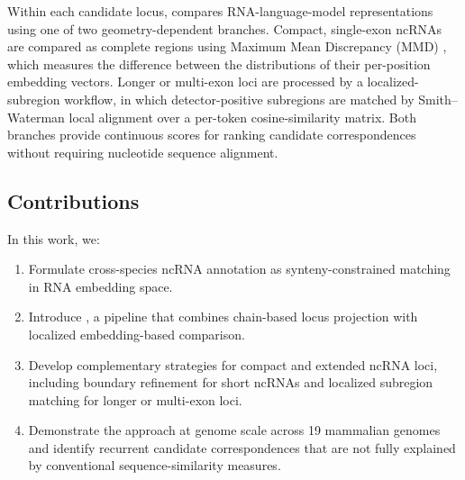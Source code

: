 Within each candidate locus, \curia{} compares RNA-language-model
representations using one of two geometry-dependent branches. Compact,
single-exon ncRNAs are compared as complete regions using Maximum Mean
Discrepancy (MMD)
\citep{grettonKernelTwoSampleTest2012}, which measures the difference between
the distributions of their per-position embedding vectors. Longer or
multi-exon loci are processed by a localized-subregion workflow, in which
detector-positive subregions are matched by Smith--Waterman local alignment
\citep{smithIdentificationCommonMolecular1981} over a per-token cosine-similarity
matrix. Both branches provide continuous scores for ranking candidate
correspondences without requiring nucleotide sequence alignment.

\subsection{Contributions}
In this work, we:
\begin{enumerate}
  \item Formulate cross-species ncRNA annotation as synteny-constrained matching
  in RNA embedding space.
  \item Introduce \curia{}, a pipeline that combines chain-based locus projection
  with localized embedding-based comparison.
  \item Develop complementary strategies for compact and extended ncRNA loci,
  including boundary refinement for short ncRNAs and localized subregion
  matching for longer or multi-exon loci.
  \item Demonstrate the approach at genome scale across 19 mammalian genomes and
  identify recurrent candidate correspondences that are not fully explained
  by conventional sequence-similarity measures.
\end{enumerate}
